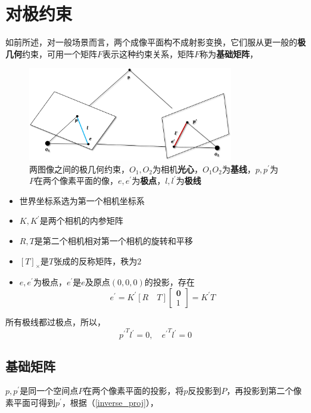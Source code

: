 \section{对极约束}
	如前所述，对一般场景而言，两个成像平面构不成射影变换，它们服从更一般的\textbf{极几何}约束，可用一个矩阵$F$表示这种约束关系，矩阵$F$称为\textbf{基础矩阵}，
	\begin{figure}[H]
		\begin{center}
			\includegraphics[width=0.8\textwidth]{../images/base_matrix.png}
		\end{center}
		\caption{两图像之间的极几何约束，$O_1,O_2$为相机\textbf{光心}，$O_1O_2$为\textbf{基线}，$p,p^{\prime}$为$P$在两个像素平面的像，$e,e^\prime$为\textbf{极点}，$l,l^{\prime}$为\textbf{极线}}
	\end{figure}
	\begin{itemize}
		\item 世界坐标系选为第一个相机坐标系
		\item $K,K^{\prime}$是两个相机的内参矩阵
		\item $R,T$是第二个相机相对第一个相机的旋转和平移
		\item $[T]_{\times}$是$T$张成的反称矩阵，秩为$2$
		\item $e,e^\prime$为极点，$e^\prime$是$e$及原点$(0,0,0)$的投影，存在
			$$
				e^\prime = K^\prime[R \quad T]\begin{bmatrix}
					\mathbf{0}\\
					1
				\end{bmatrix} = K^\prime T
			$$	
	\end{itemize}

	所有极线都过极点，所以，
	$$
		{p^\prime}^T l^\prime = 0, \quad {e^\prime}^T l^\prime = 0
	$$
	\subsection*{基础矩阵}
		$p,p^\prime$是同一个空间点$P$在两个像素平面的投影，将$p$反投影到$P$，再投影到第二个像素平面可得到$p^\prime$，根据（\ref{inverse_proj}），

